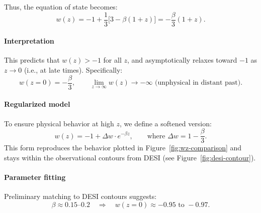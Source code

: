 \documentclass{article}
\begin{document}
Thus, the equation of state becomes:
\begin{equation}
  w(z) = -1 + \frac{1}{3} \big[ 3 - \beta (1+z) \big]
  = -\frac{\beta}{3}(1+z).
\end{equation}

\paragraph{Interpretation}
This predicts that \( w(z) > -1 \) for all \( z \), and asymptotically relaxes toward $-1$ as $z \rightarrow 0$ (i.e., at late times). Specifically:
\begin{equation}\label{eq:auto233}
w(z=0) = -\frac{\beta}{3}, \qquad
  \lim_{z \to \infty} w(z) \to -\infty \text{ (unphysical in distant past)}.
\end{equation}

\paragraph{Regularized model}
To ensure physical behavior at high $z$, we define a softened version:
\begin{equation}
  w(z) = -1 + \Delta w \cdot e^{-\beta z},
  \qquad \text{where } \Delta w = 1 - \frac{\beta}{3}.
\end{equation}
This form reproduces the behavior plotted in Figure~\ref{fig:wz-comparison} and stays within the observational contours from DESI (see Figure~\ref{fig:desi-contour}).

\paragraph{Parameter fitting}
Preliminary matching to DESI contours suggests:
\begin{equation}\label{eq:auto234}
\beta \approx 0.15\text{–}0.2
  \quad \Rightarrow \quad
  w(z=0) \approx -0.95\text{ to }-0.97.
\end{equation}

\medskip
\begin{center}
\end{center}
\medskip
\end{document}
